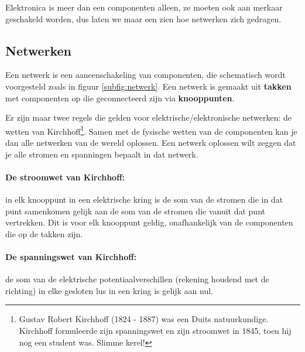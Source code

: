 \documentclass{article}
\begin{document}
		Elektronica is meer dan een componenten alleen, ze moeten ook aan merkaar geschakeld worden, dus laten we maar een zien hoe netwerken zich gedragen.

		\subsection{Netwerken}

			Een netwerk is een aaneenschakeling van componenten, die schematisch wordt voorgesteld zoals in figuur \ref{subfig:netwerk}. Een netwerk is gemaakt uit \textbf{takken}  met componenten op die geconnecteerd zijn via \textbf{knooppunten}. 

			 Er zijn maar twee regels die gelden voor elektrische/elektronische netwerken: de wetten van Kirchhoff\footnote{Gustav Robert Kirchhoff (1824 - 1887) was een Duits natuurkundige. Kirchhoff formuleerde zijn spanningswet en zijn stroomwet in 1845, toen hij nog een student was. Slimme kerel!}. Samen met de fysische wetten van de componenten kan je dan alle netwerken van de wereld oplossen. Een netwerk oplossen wilt zeggen dat je alle stromen en spanningen bepaalt in dat netwerk.

			\paragraph*{De stroomwet van Kirchhoff:} in elk knooppunt in een elektrische kring is de som van de stromen die in dat punt samenkomen gelijk aan de som van de stromen die vanuit dat punt vertrekken. Dit is voor elk knooppunt geldig, onafhankelijk van de componenten die op de takken zijn. 
			\paragraph*{De spanningswet van Kirchhoff:} de som van de elektrische potentiaalverschillen (rekening houdend met de richting) in elke gesloten lus in een kring is gelijk aan nul. 
\end{document}
